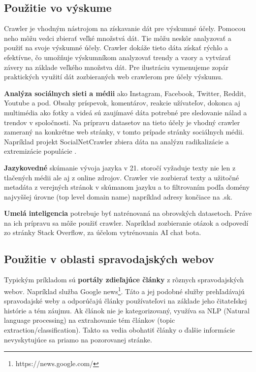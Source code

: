 \subsection{Použitie vo výskume}
Crawler je vhodným nástrojom na získavanie dát pre výskumné účely. Pomocou neho môžu vedci zbierať veľké množstvá dát. Tie môžu neskôr analyzovať a použiť na svoje výskumné účely. Crawler dokáže tieto dáta získať rýchlo a efektívne, čo umožňuje výskumníkom analyzovať trendy a vzory a vytvárať závery na základe veľkého množstva dát. Pre ilustráciu vymenujeme zopár praktických využití dát zozbieraných web crawlerom pre účely výskumu. 

\textbf{Analýza sociálnych sieti a médii} ako Instagram, Facebook, Twitter, Reddit, Youtube a pod. Obsahy príspevok, komentárov, reakcie užívateľov, dokonca aj multimédia ako fotky a videá sú zaujímavé dáta potrebné pre sledovanie nálad a trendov v spoločnosti. Na prípravu datasetov na tieto účely je vhodný crawler zameraný na konkrétne web stránky, v tomto prípade stránky sociálnych médii. Napríklad projekt SocialNetCrawler zbiera dáta na analýzu radikalizácie a extremizácie populácie \cite{socialNetCrawler}.

\textbf{Jazykovedné} skúmanie vývoja jazyka v 21. storočí vyžaduje texty nie len z tlačených médii ale aj z online zdrojov. Crawler vie zozbierať texty a užitočné metadáta z verejných stránok v skúmanom jazyku a to filtrovaním podľa domény najvyššej úrovne (top level domain name) napríklad adresy končiace na .sk.

\textbf{Umelá inteligencia} potrebuje byť natrénovaná na obrovských datasetoch. Práve na ich prípravu sa môže použiť crawler. Napríklad zozbieranie otázok a odpovedí zo stránky Stack Overflow, za účelom vytrénovania AI chat bota. \cite{stackOverflowCrawl}

\subsection{Použitie v oblasti spravodajských webov}
Typickým príkladom sú \textbf{portály zdieľajúce články} z rôznych spravodajských webov. Napríklad služba Google news\footnote{https://news.google.com/}. Táto a jej podobné služby prehľadávajú spravodajské weby a odporúčajú články používateľovi na základe jeho čitateľskej histórie a tém záujmu. Ak článok nie je kategorizovaný, využíva sa NLP (Natural language processing) na extrahovanie tém článkov (topic extraction/classification). Takto sa vedia obohatiť články o ďalšie informácie nevyskytujúce sa priamo na pozorovanej stránke.

